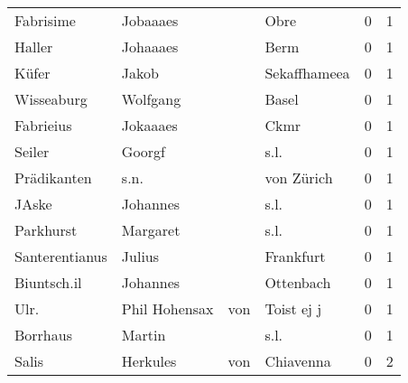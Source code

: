 \begin{tabular}{llllrr}
                Fabrisime &                           Jobaaaes &             &                                        Obre &          0 &         1 \\
                   Haller &                           Johaaaes &             &                                        Berm &          0 &         1 \\
                    Küfer &                              Jakob &             &                                Sekaffhameea &          0 &         1 \\
               Wisseaburg &                           Wolfgang &             &                                       Basel &          0 &         1 \\
                Fabrieius &                           Jokaaaes &             &                                        Ckmr &          0 &         1 \\
                   Seiler &                             Goorgf &             &                                        s.l. &          0 &         1 \\
              Prädikanten &                               s.n. &             &                                  von Zürich &          0 &         1 \\
                    JAske &                           Johannes &             &                                        s.l. &          0 &         1 \\
                Parkhurst &                           Margaret &             &                                        s.l. &          0 &         1 \\
           Santerentianus &                             Julius &             &                                   Frankfurt &          0 &         1 \\
              Biuntsch.il &                           Johannes &             &                                   Ottenbach &          0 &         1 \\
                     Ulr. &                     Phil  Hohensax &         von &                                  Toist ej j &          0 &         1 \\
                 Borrhaus &                             Martin &             &                                        s.l. &          0 &         1 \\
                    Salis &                           Herkules &         von &                                   Chiavenna &          0 &         2 \\

\end{tabular}
